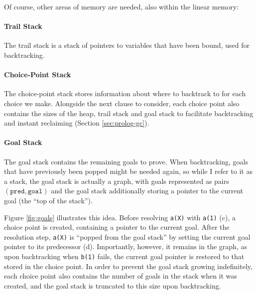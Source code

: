 Of course, other areas of memory are needed, also within the linear memory:

\paragraph{Trail Stack} The trail stack is a stack of pointers to variables that have been bound, used for backtracking.

\paragraph{Choice-Point Stack} The choice-point stack stores information about where to backtrack to for each choice we make. Alongside the next clause to consider, each choice point also contains the sizes of the heap, trail stack and goal stack to facilitate backtracking and instant reclaiming (Section \ref{sec:prolog-gc}).

\paragraph{Goal Stack} The goal stack contains the remaining goals to prove. When backtracking, goals that have previously been popped might be needed again, so while I refer to it as a stack, the goal stack is actually a graph, with goals represented as pairs $(\texttt{pred}, \texttt{goal})$ and the goal stack additionally storing a pointer to the current goal (the ``top of the stack'').

Figure \ref{fig:goals} illustrates this idea. Before resolving \texttt{a(X)} with \texttt{a(1)} (c), a choice point is created, containing a pointer to the current goal. After the resolution step, \texttt{a(X)} is ``popped from the goal stack'' by setting the current goal pointer to its predecessor (d). Importantly, however, it remains in the graph, as upon backtracking when \texttt{b(1)} fails, the current goal pointer is restored to that stored in the choice point. In order to prevent the goal stack growing indefinitely, each choice point also contains the number of goals in the stack when it was created, and the goal stack is truncated to this size upon backtracking.

